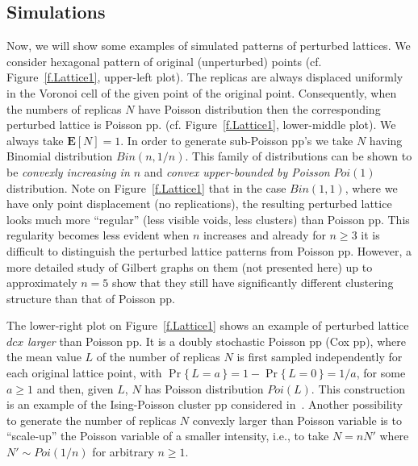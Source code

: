 \documentclass[conference]{IEEEtran}
\begin{document}
\subsection{Simulations}
\label{ss.simulation}
Now, we will show some examples of simulated 
patterns of perturbed lattices. We consider hexagonal pattern of 
original (unperturbed) points (cf. Figure~\ref{f.Lattice1}, upper-left plot).
The replicas are always displaced uniformly in the Voronoi cell 
of the given point of the original point. Consequently, when the
numbers of replicas $N$ have Poisson distribution then the corresponding
perturbed lattice is Poisson pp. (cf. Figure~\ref{f.Lattice1}, lower-middle
plot). We always take ${{\mathbf E}}[N]=1$.
In order to generate sub-Poisson pp's we take $N$ having Binomial
distribution $Bin(n,1/n)$. This family of distributions can be shown to be {\em convexly increasing in
$n$} and {\em convex upper-bounded by Poisson} $Poi(1)$ distribution.
Note on Figure~\ref{f.Lattice1}
that in the case $Bin(1,1)$, where we have only
point displacement (no replications), the resulting perturbed lattice
looks much more ``regular'' (less visible voids, less clusters)
than Poisson pp. This  regularity
becomes less evident when $n$ increases and already for $n\ge3$ 
it is difficult to distinguish the perturbed lattice patterns from
Poisson pp. However, a more detailed study  of 
Gilbert graphs on them (not presented
here) up to approximately $n=5$ show that they
still have significantly different clustering structure than that of
Poisson pp.

The lower-right plot on Figure~\ref{f.Lattice1} shows an example of
perturbed lattice $dcx$ {\em larger} than Poisson pp. 
It is a  doubly stochastic Poisson pp (Cox pp), where the mean value $L$ 
of the number of replicas $N$ is first sampled independently for each 
original lattice point, with 
$\Pr\{\,L=a\,\}=1-\Pr\{\,L=0\,\}=1/a$, for some $a\ge1$  
and then, given $L$, $N$ has
Poisson distribution $Poi(L)$. This construction is an example of
the Ising-Poisson cluster pp considered in~\cite[Section~5.1]{snorder}.
Another possibility to generate the  number of replicas $N$ convexly
larger than Poisson variable is to ``scale-up''  the Poisson variable 
of a smaller intensity, i.e., to take 
$N=nN'$ where $N'\sim Poi(1/n)$ for arbitrary $n\ge1$.
\end{document}
